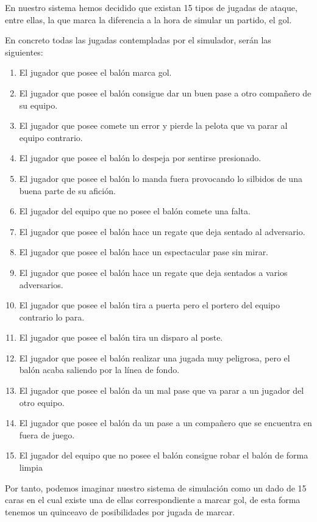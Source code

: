 En nuestro sistema hemos decidido que existan 15 tipos de jugadas de ataque,
entre ellas, la que marca la diferencia a la hora de simular un partido, el gol.

En concreto todas las jugadas contempladas por el simulador, serán las siguientes:
\begin{enumerate}
\item El jugador que posee el balón marca gol.
\item El jugador que posee el balón consigue dar un buen pase a otro compañero
  de su equipo.
\item El jugador que posee comete un error y pierde la pelota que va parar al equipo
  contrario.
\item El jugador que posee el balón lo despeja por sentirse presionado.
\item El jugador que posee el balón lo manda fuera provocando lo silbidos de una
  buena parte de su afición.
\item El jugador del equipo que no posee el balón comete una falta.
\item El jugador que posee el balón hace un regate que deja sentado al
  adversario.
\item El jugador que posee el balón hace un espectacular pase sin mirar.
\item El jugador que posee el balón hace un regate que deja sentados a varios
  adversarios.
\item El jugador que posee el balón tira a puerta pero el portero del equipo
  contrario lo para.
\item El jugador que posee el balón tira un disparo al poste.
\item El jugador que posee el balón realizar una jugada muy peligrosa, pero el
  balón acaba saliendo por la línea de fondo.
\item El jugador que posee el balón da un mal pase que va parar a un jugador del
  otro equipo.
\item El jugador que posee el balón da un pase a un compañero que se encuentra
  en fuera de juego.
\item El jugador del equipo que no posee el balón consigue robar el balón de
  forma limpia
\end{enumerate}

Por tanto, podemos imaginar nuestro sistema de simulación como un dado de 15
caras en el cual existe una de ellas correspondiente a marcar gol, de esta forma
tenemos un quinceavo de posibilidades por jugada de marcar.


